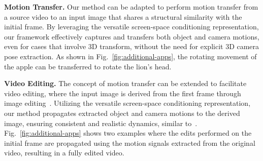\textbf{Motion Transfer.}
Our method can be adapted to perform motion transfer from a source video to an input image that shares a structural similarity with the initial frame. By leveraging the versatile screen-space conditioning representation, our framework effectively captures and transfers both object and camera motions, even for cases that involve 3D transform, without the need for explicit 3D camera pose extraction. As shown in Fig.~\ref{fig:additional-apps}, the rotating movement of the apple can be transferred to rotate the lion's head. 



\textbf{Video Editing.}
The concept of motion transfer can be extended to facilitate video editing, where the input image is derived from the first frame through image editing~\cite{brooks2023instructpix2pix}. Utilizing the versatile screen-space conditioning representation, our method propagates extracted object and camera motions to the derived image, ensuring consistent and realistic dynamics, similar to~\cite{liu2024generative}. Fig.~\ref{fig:additional-apps} shows two examples where the edits performed on the initial frame are propagated using the motion signals extracted from the original video, resulting in a fully edited video.
% 




